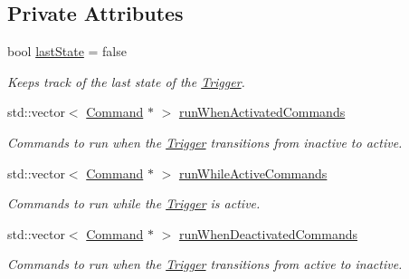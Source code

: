\subsection*{Private Attributes}
\begin{DoxyCompactItemize}
\item 
bool \mbox{\hyperlink{classlib_iterative_robot_1_1_trigger_ae053034579fc72b555c2052c37c1e410}{last\+State}} = false
\begin{DoxyCompactList}\small\item\em Keeps track of the last state of the \mbox{\hyperlink{classlib_iterative_robot_1_1_trigger}{Trigger}}. \end{DoxyCompactList}\item 
\mbox{\label{classlib_iterative_robot_1_1_trigger_a0216c1f8ae6ad31c6ba15f9c62079828}} 
std\+::vector$<$ \mbox{\hyperlink{classlib_iterative_robot_1_1_command}{Command}} $\ast$ $>$ \mbox{\hyperlink{classlib_iterative_robot_1_1_trigger_a0216c1f8ae6ad31c6ba15f9c62079828}{run\+When\+Activated\+Commands}}
\begin{DoxyCompactList}\small\item\em Commands to run when the \mbox{\hyperlink{classlib_iterative_robot_1_1_trigger}{Trigger}} transitions from inactive to active. \end{DoxyCompactList}\item 
\mbox{\label{classlib_iterative_robot_1_1_trigger_a12ae7732c77bcc9f187e60929762f0ec}} 
std\+::vector$<$ \mbox{\hyperlink{classlib_iterative_robot_1_1_command}{Command}} $\ast$ $>$ \mbox{\hyperlink{classlib_iterative_robot_1_1_trigger_a12ae7732c77bcc9f187e60929762f0ec}{run\+While\+Active\+Commands}}
\begin{DoxyCompactList}\small\item\em Commands to run while the \mbox{\hyperlink{classlib_iterative_robot_1_1_trigger}{Trigger}} is active. \end{DoxyCompactList}\item 
\mbox{\label{classlib_iterative_robot_1_1_trigger_a43ea9409f119a57f0da1b3cdc6c4e8f8}} 
std\+::vector$<$ \mbox{\hyperlink{classlib_iterative_robot_1_1_command}{Command}} $\ast$ $>$ \mbox{\hyperlink{classlib_iterative_robot_1_1_trigger_a43ea9409f119a57f0da1b3cdc6c4e8f8}{run\+When\+Deactivated\+Commands}}
\begin{DoxyCompactList}\small\item\em Commands to run when the \mbox{\hyperlink{classlib_iterative_robot_1_1_trigger}{Trigger}} transitions from active to inactive. \end{DoxyCompactList}\item 

\end{DoxyCompactItemize}
